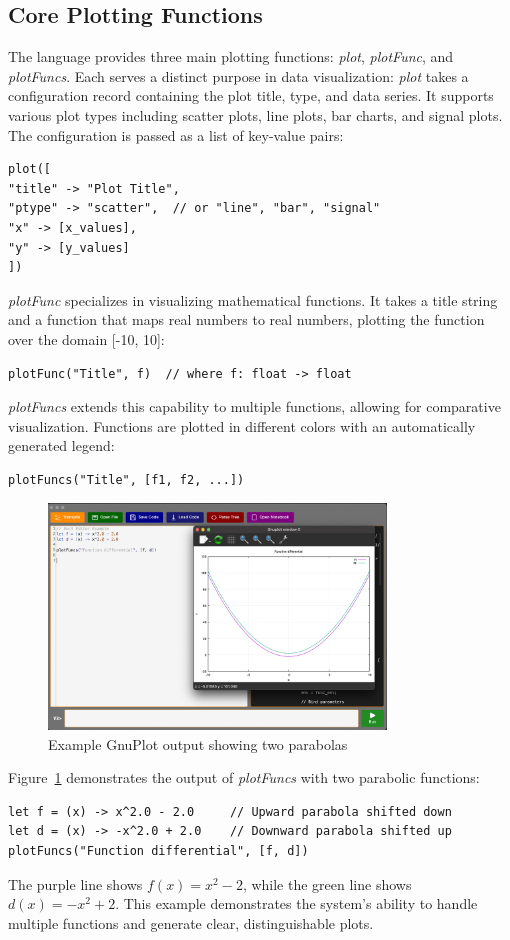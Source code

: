 \subsection{Core Plotting Functions}\label{subsec:core-plotting-functions}
The language provides three main plotting functions: \textit{plot}, \textit{plotFunc}, and \textit{plotFuncs}. Each serves a distinct purpose in data visualization:
\textit{plot} takes a configuration record containing the plot title, type, and data series. It supports various plot types including scatter plots, line plots, bar charts, and signal plots. The configuration is passed as a list of key-value pairs:
\begin{verbatim}
plot([
"title" -> "Plot Title",
"ptype" -> "scatter",  // or "line", "bar", "signal"
"x" -> [x_values],
"y" -> [y_values]
])
\end{verbatim}
\textit{plotFunc} specializes in visualizing mathematical functions. It takes a title string and a function that maps real numbers to real numbers, plotting the function over the domain [-10, 10]:
\begin{verbatim}
plotFunc("Title", f)  // where f: float -> float
\end{verbatim}
\textit{plotFuncs} extends this capability to multiple functions, allowing for comparative visualization. Functions are plotted in different colors with an automatically generated legend:
\begin{verbatim}
plotFuncs("Title", [f1, f2, ...])
\end{verbatim}
\begin{figure}[H]
    \centering
    \includegraphics[width=0.8\textwidth]{assets/gnuplot}
    \caption{Example GnuPlot output showing two parabolas}\label{fig:gnuplot-example}
\end{figure}
Figure~\ref{fig:gnuplot-example} demonstrates the output of \textit{plotFuncs} with two parabolic functions:
\begin{verbatim}
let f = (x) -> x^2.0 - 2.0     // Upward parabola shifted down
let d = (x) -> -x^2.0 + 2.0    // Downward parabola shifted up
plotFuncs("Function differential", [f, d])
\end{verbatim}
The purple line shows $f(x) = x^2 - 2$, while the green line shows $d(x) = -x^2 + 2$. This example demonstrates the system's ability to handle multiple functions and generate clear, distinguishable plots.
